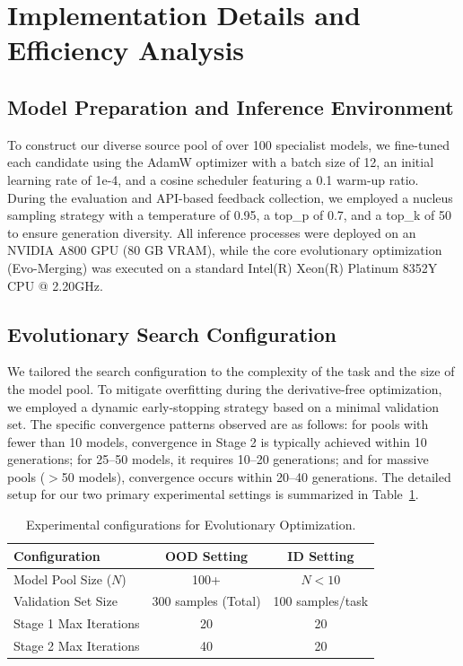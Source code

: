 \setcounter{secnumdepth}{2}


\appendix 


\section{Implementation Details and Efficiency Analysis}
\label{sec:Evo-Merging Implement Detail}

\subsection{Model Preparation and Inference Environment}
To construct our diverse source pool of over 100 specialist models, we fine-tuned each candidate using the AdamW optimizer with a batch size of 12, an initial learning rate of 1e-4, and a cosine scheduler featuring a 0.1 warm-up ratio. 
During the evaluation and API-based feedback collection, we employed a nucleus sampling strategy with a temperature of 0.95, a top\_p of 0.7, and a top\_k of 50 to ensure generation diversity.
All inference processes were deployed on an NVIDIA A800 GPU (80 GB VRAM), while the core evolutionary optimization (Evo-Merging) was executed on a standard Intel(R) Xeon(R) Platinum 8352Y CPU @ 2.20GHz.

\subsection{Evolutionary Search Configuration}
We tailored the search configuration to the complexity of the task and the size of the model pool. 
To mitigate overfitting during the derivative-free optimization, we employed a dynamic early-stopping strategy based on a minimal validation set. The specific convergence patterns observed are as follows: for pools with fewer than 10 models, convergence in Stage 2 is typically achieved within 10 generations; for 25--50 models, it requires 10--20 generations; and for massive pools ($>$50 models), convergence occurs within 20--40 generations. The detailed setup for our two primary experimental settings is summarized in Table~\ref{tab:exp_setups}.

\begin{table}[htbp]
\centering
\small
\caption{Experimental configurations for Evolutionary Optimization.}
\label{tab:exp_setups}
\vspace{-2mm}
\setlength{\tabcolsep}{2.5mm}
\begin{tabular}{lcc}
\toprule
\textbf{Configuration} & \textbf{OOD Setting} & \textbf{ID Setting} \\ 
\midrule
Model Pool Size ($N$) & 100+ & $N < 10$ \\ 
Validation Set Size & 300 samples (Total) & 100 samples/task \\ 
Stage 1 Max Iterations & 20 & 20 \\ 
Stage 2 Max Iterations & 40 & 20 \\ 
\bottomrule
\end{tabular}
\vspace{-2mm}
\end{table}

